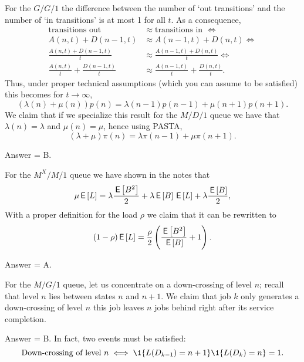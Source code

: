 \begin{exercise}[201807] 
For the $G/G/1$ the difference between the number of `out
    transitions' and the number of `in transitions' is at most 1 for all $t$. As a consequence,
    \begin{align*}
\text{transitions out } &\approx \text{transitions in } \iff \\
      A(n,t) + D(n-1,t) &\approx A(n-1,t) + D(n,t)  \iff \\
      \frac{A(n,t) + D(n-1,t)}t &\approx \frac{A(n-1,t) + D(n, t)}t \iff \\
      \frac{A(n,t)}t + \frac{D(n-1,t)}t &\approx \frac{A(n-1,t)}t + \frac{D(n,t)}t.
    \end{align*}
Thus, under proper technical assumptions (which you can assume to be satisfied) this becomes for $t\to\infty$, 
\begin{equation*}
  (\lambda(n) +\mu(n))p(n) = \lambda(n-1)p(n-1) + \mu(n+1)p(n+1).
\end{equation*}
We claim that if we specialize this result for the $M/D/1$ queue we have that
$ \lambda(n) = \lambda$ and $\mu(n) = \mu$, hence using PASTA, 
\begin{equation*}
  (\lambda +\mu)\pi(n) = \lambda\pi(n-1) + \mu\pi(n+1).
\end{equation*}
\begin{solution}
Answer = B.
\end{solution}
\end{exercise}

\begin{exercise}[201807]
For the $M^X/M/1$ queue we have shown in the notes that 
\begin{equation*}
  \mu \,\mathsf{E}\left[L\right] = \lambda \frac{\,\mathsf{E}\left[B^2\right]}2  + \lambda \,\mathsf{E}\left[B\right] \,\mathsf{E}\left[L\right] +\lambda \frac{\,\mathsf{E}\left[B\right]}2,
\end{equation*}
With a proper definition for the load  $\rho$ we claim that it can be rewritten to 
\begin{equation*}
(1- \rho) \,\mathsf{E}\left[L\right] = \frac \rho2 \left( \frac{\,\mathsf{E}\left[B^2\right]}{\,\mathsf{E}\left[B\right]} + 1\right).
\end{equation*}
\begin{solution}
Answer = A.
\end{solution}
\end{exercise}


\begin{exercise}[201807]
For the $M/G/1$ queue, let us concentrate on a down-crossing of level $n$; recall that level $n$ lies between states $n$
and $n+1$.  We claim that job $k$  only generates a down-crossing of level $n$ this job  leaves $n$ jobs behind right after its service completion.
\begin{solution}
Answer = B.
In fact, two events must be satisfied: 
 \begin{equation*}
   \text{Down-crossing of level $n$} \iff \1{L(D_{k-1}) = n+1}\1{L(D_k)=n} = 1.
 \end{equation*}
\end{solution}
\end{exercise}

